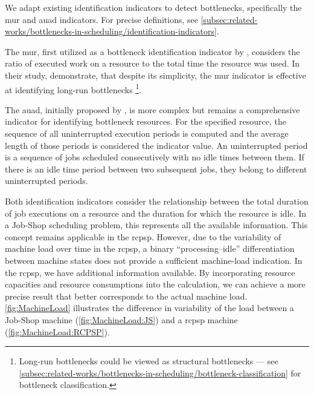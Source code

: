 We adapt existing identification indicators to detect bottlenecks,
specifically the \acf{mur} and \acf{auad} indicators.
For precise definitions, see \cref{subsec:related-works/bottlenecks-in-scheduling/identification-indicators}.
        
The \ac{mur}, first utilized as a bottleneck identification indicator by \citet{Lawrence1994},
considers the ratio of executed work on a resource to the total time the resource was used.
In their study, \citet{Lawrence1994} demonstrate, that despite its simplicity,
the \ac{mur} indicator is effective at identifying long-run bottlenecks%
\footnote{
Long-run bottlenecks could be viewed as structural bottlenecks ---
see \cref{subsec:related-works/bottlenecks-in-scheduling/bottleneck-classification} for bottleneck classification.
}.


The \ac{auad}, initially proposed by \citet{Roser2001},
is more complex but remains a comprehensive indicator for identifying bottleneck resources.
For the specified resource, the sequence of all uninterrupted execution periods is computed
and the average length of those periods is considered the indicator value.
An uninterrupted period is a sequence of jobs scheduled consecutively with no idle times between them.
If there is an idle time period between two subsequent jobs,
they belong to different uninterrupted periods.

Both identification indicators consider the relationship between the total duration
of job executions on a resource and the duration for which the resource is idle.
In a Job-Shop scheduling problem,
this represents all the available information.
This concept remains applicable in the \ac{rcpsp}.
However, due to the variability of machine load over time in the \ac{rcpsp},
a binary \enquote{processing--idle} differentiation between machine states
does not provide a sufficient machine-load indication.
In the \ac{rcpsp}, we have additional information available.
By incorporating resource capacities and resource consumptions into the calculation,
we can achieve a more precise result that better corresponds to the actual machine load.
\cref{fig:MachineLoad} illustrates the difference in variability of the load between
a Job-Shop machine (\cref{fig:MachineLoad:JS})
and a \ac{rcpsp} machine (\cref{fig:MachineLoad:RCPSP}).

